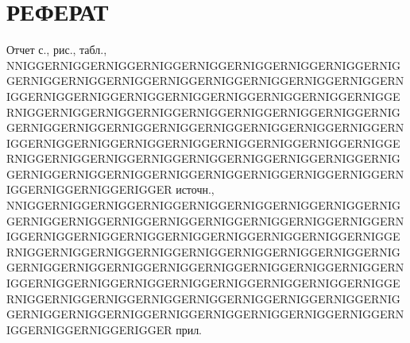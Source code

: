 \section*{РЕФЕРАТ}

Отчет \pageref{LastPage} с.,  рис.,  табл., NNIGGERNIGGERNIGGERNIGGERNIGGERNIGGERNIGGERNIGGERNIGGERNIGGERNIGGERNIGGERNIGGERNIGGERNIGGERNIGGERNIGGERNIGGERNIGGERNIGGERNIGGERNIGGERNIGGERNIGGERNIGGERNIGGERNIGGERNIGGERNIGGERNIGGERNIGGERNIGGERNIGGERNIGGERNIGGERNIGGERNIGGERNIGGERNIGGERNIGGERNIGGERNIGGERNIGGERNIGGERNIGGERNIGGERNIGGERNIGGERNIGGERNIGGERNIGGERNIGGERNIGGERNIGGERNIGGERNIGGERNIGGERNIGGERNIGGERNIGGERNIGGERNIGGERNIGGERNIGGERNIGGERNIGGERNIGGERNIGGERNIGGERNIGGERNIGGERNIGGERIGGER источн., NNIGGERNIGGERNIGGERNIGGERNIGGERNIGGERNIGGERNIGGERNIGGERNIGGERNIGGERNIGGERNIGGERNIGGERNIGGERNIGGERNIGGERNIGGERNIGGERNIGGERNIGGERNIGGERNIGGERNIGGERNIGGERNIGGERNIGGERNIGGERNIGGERNIGGERNIGGERNIGGERNIGGERNIGGERNIGGERNIGGERNIGGERNIGGERNIGGERNIGGERNIGGERNIGGERNIGGERNIGGERNIGGERNIGGERNIGGERNIGGERNIGGERNIGGERNIGGERNIGGERNIGGERNIGGERNIGGERNIGGERNIGGERNIGGERNIGGERNIGGERNIGGERNIGGERNIGGERNIGGERNIGGERNIGGERNIGGERNIGGERNIGGERNIGGERNIGGERNIGGERIGGER прил.

%
%
